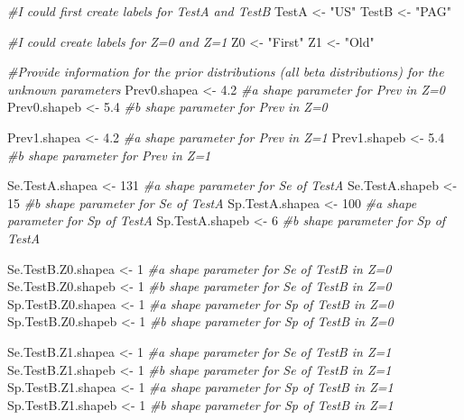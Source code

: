 \documentclass[
]{book}
\newenvironment{Shaded}{\begin{snugshade}}{\end{snugshade}}
\newcommand{\CommentTok}[1]{\textcolor[rgb]{0.56,0.35,0.01}{\textit{#1}}}
\newcommand{\DecValTok}[1]{\textcolor[rgb]{0.00,0.00,0.81}{#1}}
\newcommand{\FloatTok}[1]{\textcolor[rgb]{0.00,0.00,0.81}{#1}}
\newcommand{\NormalTok}[1]{#1}
\newcommand{\OtherTok}[1]{\textcolor[rgb]{0.56,0.35,0.01}{#1}}
\newcommand{\StringTok}[1]{\textcolor[rgb]{0.31,0.60,0.02}{#1}}
\begin{document}
\begin{Shaded}
\begin{Highlighting}[]
\CommentTok{\#I could first create labels for TestA and TestB}
\NormalTok{TestA }\OtherTok{\textless{}{-}} \StringTok{"US"}
\NormalTok{TestB }\OtherTok{\textless{}{-}} \StringTok{"PAG"}

\CommentTok{\#I could create labels for Z=0 and Z=1}
\NormalTok{Z0 }\OtherTok{\textless{}{-}} \StringTok{"First"}
\NormalTok{Z1 }\OtherTok{\textless{}{-}} \StringTok{"Old"}

\CommentTok{\#Provide information for the prior distributions (all beta distributions) for the unknown parameters }
\NormalTok{Prev0.shapea }\OtherTok{\textless{}{-}} \FloatTok{4.2}         \CommentTok{\#a shape parameter for Prev in Z=0    }
\NormalTok{Prev0.shapeb }\OtherTok{\textless{}{-}} \FloatTok{5.4}         \CommentTok{\#b shape parameter for Prev in Z=0}

\NormalTok{Prev1.shapea }\OtherTok{\textless{}{-}} \FloatTok{4.2}         \CommentTok{\#a shape parameter for Prev in Z=1    }
\NormalTok{Prev1.shapeb }\OtherTok{\textless{}{-}} \FloatTok{5.4}         \CommentTok{\#b shape parameter for Prev in Z=1}

\NormalTok{Se.TestA.shapea }\OtherTok{\textless{}{-}} \DecValTok{131}     \CommentTok{\#a shape parameter for Se of TestA}
\NormalTok{Se.TestA.shapeb }\OtherTok{\textless{}{-}} \DecValTok{15}     \CommentTok{\#b shape parameter for Se of TestA}
\NormalTok{Sp.TestA.shapea }\OtherTok{\textless{}{-}} \DecValTok{100}     \CommentTok{\#a shape parameter for Sp of TestA}
\NormalTok{Sp.TestA.shapeb }\OtherTok{\textless{}{-}} \DecValTok{6}     \CommentTok{\#b shape parameter for Sp of TestA}

\NormalTok{Se.TestB.Z0.shapea }\OtherTok{\textless{}{-}} \DecValTok{1}     \CommentTok{\#a shape parameter for Se of TestB in Z=0}
\NormalTok{Se.TestB.Z0.shapeb }\OtherTok{\textless{}{-}} \DecValTok{1}     \CommentTok{\#b shape parameter for Se of TestB in Z=0}
\NormalTok{Sp.TestB.Z0.shapea }\OtherTok{\textless{}{-}} \DecValTok{1}     \CommentTok{\#a shape parameter for Sp of TestB in Z=0}
\NormalTok{Sp.TestB.Z0.shapeb }\OtherTok{\textless{}{-}} \DecValTok{1}     \CommentTok{\#b shape parameter for Sp of TestB in Z=0}

\NormalTok{Se.TestB.Z1.shapea }\OtherTok{\textless{}{-}} \DecValTok{1}     \CommentTok{\#a shape parameter for Se of TestB in Z=1}
\NormalTok{Se.TestB.Z1.shapeb }\OtherTok{\textless{}{-}} \DecValTok{1}     \CommentTok{\#b shape parameter for Se of TestB in Z=1}
\NormalTok{Sp.TestB.Z1.shapea }\OtherTok{\textless{}{-}} \DecValTok{1}     \CommentTok{\#a shape parameter for Sp of TestB in Z=1}
\NormalTok{Sp.TestB.Z1.shapeb }\OtherTok{\textless{}{-}} \DecValTok{1}     \CommentTok{\#b shape parameter for Sp of TestB in Z=1}


\end{Highlighting}
\end{Shaded}
\end{document}
